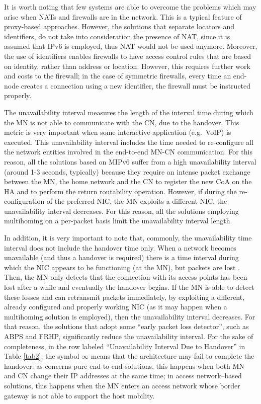 \documentclass[preprint,12pt]{elsarticle}
\begin{document}
It is worth noting that few systems are able to overcome the problems which may arise when NATs and firewalls are in the network. 
This is a typical feature of proxy-based approaches. 
However, the solutions that separate locators and identifiers, do not take into consideration the presence of NAT, since it is assumed that IPv6 is employed, thus NAT would not be used anymore.
Moreover, the use of identifiers enables firewalls to have access control rules 
that are based on identity, rather than address or location. However, this 
requires further work and costs to the firewall; in the case of symmetric firewalls, 
every time an end-node creates a connection using a new identifier, the 
firewall must be instructed properly. 

The unavailability interval measures the length of the interval time during 
which the MN is not able to communicate with the CN, due to the handover. This 
metric is very important when some interactive application (e.g.~VoIP) is 
executed. 
This unavailability interval includes the time needed to re-configure all the 
network entities involved in the end-to-end MN-CN communication. 
For this reason, all the solutions based on MIPv6 suffer from a high unavailability 
interval (around 1-3 seconds, typically) because they require an intense packet 
exchange between the MN, the home network and the CN to register the new 
\ac{CoA} on the \ac{HA} and to perform the return routability 
operation. 
However, if during the re-configuration of the preferred NIC, the MN exploits a different NIC, the unavailability interval decreases. 
For this reason, all the solutions employing multihoming on a per-packet basis limit the unavailability interval length. 

In addition, it is very important to note that, commonly, the unavailability time interval does not include the handover time only. When a network becomes unavailable (and thus a handover is required) there is a time interval during which the NIC appears to be functioning (at the MN), but packets are lost \cite{ngmast}. 
Then, the MN only detects that the connection with its access points has been lost after a while and eventually the handover begins. If the MN is able to detect these losses and can retransmit packets immediately, by exploiting a different, already configured and properly working NIC (as it may happen when a multihoming solution is employed), then the unavailability interval decreases. 
For that reason, the solutions that adopt some “early packet loss detector”, such as ABPS and FRHP, significantly reduce the unavailability interval.
For the sake of completeness, in the row labeled ``Unavailability Interval Due to Handover'' in Table \ref{tab2}, the symbol $\infty$ 
means that the architecture may fail to complete the handover: as concerns pure end-to-end solutions, this happens when both MN and CN change their IP addresses at the same time; in access network–based solutions, this happens when the MN enters an access network whose border gateway is not able to support the host mobility.
\end{document}
